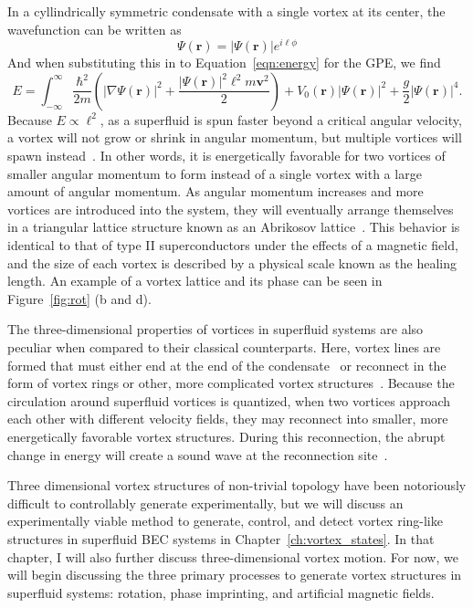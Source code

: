 In a cyllindrically symmetric condensate with a single vortex at its center, the wavefunction can be written as
\begin{equation}
\Psi(\mathbf{r}) = |\Psi(\mathbf{r})|e^{i\ell\phi}
\end{equation}
And when substituting this in to Equation~\eqref{eqn:energy} for the GPE, we find
\begin{equation}
E = \int_{-\infty}^\infty \frac{\hbar^2}{2m}\left( |\nabla\Psi(\mathbf{r})|^2 + \frac{|\Psi(\mathbf{r})|^2\ell^2 m\mathbf{v}^2}{2}\right) + V_0(\mathbf{r})|\Psi(\mathbf{r})|^2 + \frac{g}{2}|\Psi(\mathbf{r})|^4.
\end{equation}
\noindent Because $E \propto \ell^2$, as a superfluid is spun faster beyond a critical angular velocity, a vortex will not grow or shrink in angular momentum, but multiple vortices will spawn instead~\cite{pethick2002}.
In other words, it is energetically favorable for two vortices of smaller angular momentum to form instead of a single vortex with a large amount of angular momentum.
As angular momentum increases and more vortices are introduced into the system, they will eventually arrange themselves in a triangular lattice structure known as an Abrikosov lattice~\cite{abrikosov1957, fetter2001}.
This behavior is identical to that of type II superconductors under the effects of a magnetic field, and the size of each vortex is described by a physical scale known as the healing length.
An example of a vortex lattice and its phase can be seen in Figure~\ref{fig:rot} (b and d).

The three-dimensional properties of vortices in superfluid systems are also peculiar when compared to their classical counterparts.
Here, vortex lines are formed that must either end at the end of the condensate~\cite{madison2000} or reconnect in the form of vortex rings or other, more complicated vortex structures~\cite{reichl2013, barenghi2014}.
Because the circulation around superfluid vortices is quantized, when two vortices approach each other with different velocity fields, they may reconnect into smaller, more energetically favorable vortex structures.
During this reconnection, the abrupt change in energy will create a sound wave at the reconnection site~\cite{feynman1955}.

Three dimensional vortex structures of non-trivial topology have been notoriously difficult to controllably generate experimentally, but we will discuss an experimentally viable method to generate, control, and detect vortex ring-like structures in superfluid BEC systems in Chapter~\ref{ch:vortex_states}.
In that chapter, I will also further discuss three-dimensional vortex motion.
 For now, we will begin discussing the three primary processes to generate vortex structures in superfluid systems: rotation, phase imprinting, and artificial magnetic fields.

